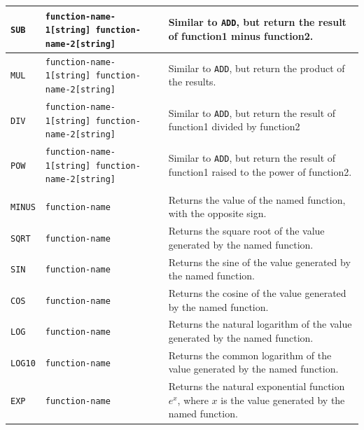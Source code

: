 \begin{center}
\begin{longtable}{|p{1.8cm} | p{4.1cm} | p{9.5cm}|}
    \texttt{SUB} & \texttt{function-name-1[string] function-name-2[string]} &
    Similar to \texttt{ADD}, but return the result of function1 minus function2.\\*
    \hline
    
    \texttt{MUL} & \texttt{function-name-1[string] function-name-2[string]} & 
    Similar to \texttt{ADD}, but return the product of the results. \\*
    \hline
    
    \texttt{DIV} & \texttt{function-name-1[string] function-name-2[string]} & 
    Similar to \texttt{ADD}, but return the result of function1 divided by function2\\*
    \hline
    
    \texttt{POW} & \texttt{function-name-1[string] function-name-2[string]} & 
    Similar to \texttt{ADD}, but return the result of function1 raised to the power of function2.\\
    \hline
    
    \rowcolor{blue!15}
    \multicolumn{3}{|l|}{1-operand operators} \\*
    \hline
    
    \texttt{MINUS} & \texttt{function-name} &
    Returns the value of the named function, with the opposite sign. \\*
    \hline

    \texttt{SQRT} & \texttt{function-name} & 
    Returns the square root of the value generated by the named function. \\*
    \hline
    
    \texttt{SIN} & \texttt{function-name} & 
    Returns the sine of the value generated by the named function. \\*
    \hline
    
    \texttt{COS} & \texttt{function-name} &
    Returns the cosine of the value generated by the named function. \\*
    \hline
    
    \texttt{LOG} & \texttt{function-name} &
    Returns the natural logarithm of the value generated by the named function. \\*
    \hline
    
    \texttt{LOG10} & \texttt{function-name} &
    Returns the common logarithm of the value generated by the named function. \\*
    \hline
    
    \texttt{EXP} & \texttt{function-name} &
    Returns the natural exponential function $e^x$, where $x$ is the value generated by the named function. \\
    \hline
    

\end{longtable}
\end{center}
